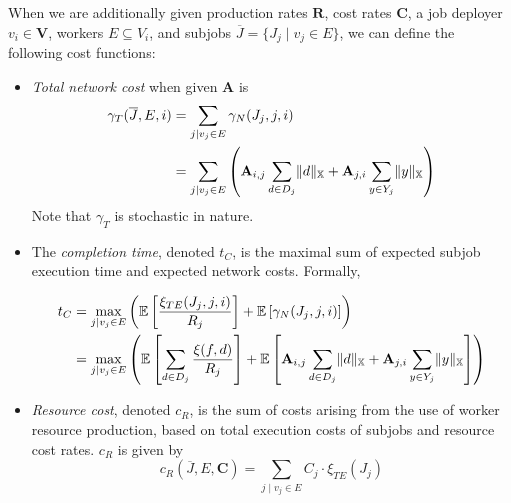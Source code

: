 \documentclass[../mthe-493-project-proposal.tex]{subfiles}
\begin{document}
    When we are additionally given production rates $\mathbf{R}$, cost rates $\mathbf{C}$, a job deployer $v_i \in \mathbf{V}$, workers $E \subseteq V_i$, and subjobs $\overline{J} = \{J_j \mid v_j \in E\}$, we can define the following cost functions:

    \begin{itemize}
        \item \textit{Total network cost} when given $\mathbf{A}$ is
              \begin{align*}
                  \gamma_T(\overline{J}, E, i) &= \sum_{j \mid v_j \in E} \gamma_N(J_j, j, i) \\
                                               &= \sum_{j \mid v_j \in E} \left(
                  \mathbf{A}_{i,j} \sum\limits_{d \in D_j} \lVert d\rVert_{\mathbb{X}} + \mathbf{A}_{j,i} \sum\limits_{y \in Y_j} \lVert y\rVert_{\mathbb{X}}
                  \right)
              \end{align*}
              Note that $\gamma_T$ is stochastic in nature.

        \item The \textit{completion time}, denoted $t_C$, is the maximal sum of expected subjob execution time and expected network costs. Formally,

              \begin{align*}
                  t_C &= \max_{j \mid v_j \in E}
                  \left(
                  \mathbb{E}\left[ \frac{\xi_{TE}(J_j, j, i)}{R_j} \right]
                  + \mathbb{E}\left[ \gamma_N(J_j, j, i) \right]
                  \right)                        \\
                      &= \max_{j \mid v_j \in E}
                  \left(
                  \mathbb{E}\left[ \sum\limits_{d \in D_j} \frac{\xi(f, d)}{R_j}\right]
                  + \mathbb{E}\left[
                      \mathbf{A}_{i,j} \sum\limits_{d \in D_j} \lVert d\rVert_{\mathbb{X}} + \mathbf{A}_{j,i} \sum\limits_{y \in Y_j} \lVert y\rVert_{\mathbb{X}}
                      \right]
                  \right)
              \end{align*}

        \item \textit{Resource cost}, denoted $c_R$, is the sum of costs arising from the use of worker resource production, based on total execution costs of subjobs and resource cost rates. $c_R$ is given by
              \begin{equation*}
                  c_R(\overline{J}, E, \mathbf{C}) = \sum_{j \mid v_j \in E} C_j \cdot \xi_{TE}(J_j)
              \end{equation*}
    \end{itemize}
\end{document}

